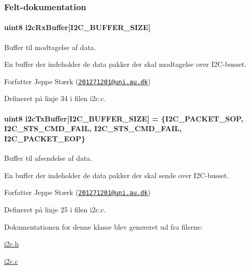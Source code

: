 \subsubsection{Felt-\/dokumentation}
\paragraph[{\texorpdfstring{i2c\+Rx\+Buffer}{i2cRxBuffer}}]{\setlength{\rightskip}{0pt plus 5cm}uint8 i2c\+Rx\+Buffer\mbox{[}{\bf I2\+C\+\_\+\+B\+U\+F\+F\+E\+R\+\_\+\+S\+I\+ZE}\mbox{]}\hspace{0.3cm}{\ttfamily [private]}}\hypertarget{class_i2_c_a88d6ebcf1ef5f528b63cf306ad1a5909}{}\label{class_i2_c_a88d6ebcf1ef5f528b63cf306ad1a5909}


Buffer til modtagelse af data. 

En buffer der indeholder de data pakker der skal modtagelse over I2\+C-\/busset.

\begin{DoxyAuthor}{Forfatter}
Jeppe Stærk (\href{mailto:201271201@uni.au.dk}{\tt 201271201@uni.\+au.\+dk}) 
\end{DoxyAuthor}


Defineret på linje 34 i filen i2c.\+c.

\paragraph[{\texorpdfstring{i2c\+Tx\+Buffer}{i2cTxBuffer}}]{\setlength{\rightskip}{0pt plus 5cm}uint8 i2c\+Tx\+Buffer\mbox{[}{\bf I2\+C\+\_\+\+B\+U\+F\+F\+E\+R\+\_\+\+S\+I\+ZE}\mbox{]} = \{{\bf I2\+C\+\_\+\+P\+A\+C\+K\+E\+T\+\_\+\+S\+OP}, {\bf I2\+C\+\_\+\+S\+T\+S\+\_\+\+C\+M\+D\+\_\+\+F\+A\+IL}, {\bf I2\+C\+\_\+\+S\+T\+S\+\_\+\+C\+M\+D\+\_\+\+F\+A\+IL}, {\bf I2\+C\+\_\+\+P\+A\+C\+K\+E\+T\+\_\+\+E\+OP}\}\hspace{0.3cm}{\ttfamily [private]}}\hypertarget{class_i2_c_af66ed5dc7817e74d7da731c994721217}{}\label{class_i2_c_af66ed5dc7817e74d7da731c994721217}


Buffer til afsendelse af data. 

En buffer der indeholder de data pakker der skal sende over I2\+C-\/busset.

\begin{DoxyAuthor}{Forfatter}
Jeppe Stærk (\href{mailto:201271201@uni.au.dk}{\tt 201271201@uni.\+au.\+dk}) 
\end{DoxyAuthor}


Defineret på linje 25 i filen i2c.\+c.



Dokumentationen for denne klasse blev genereret ud fra filerne\+:\begin{DoxyCompactItemize}
\item 
\hyperlink{i2c_8h}{i2c.\+h}\item 
\hyperlink{i2c_8c}{i2c.\+c}\end{DoxyCompactItemize}
